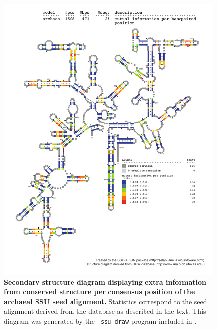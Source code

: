 \begin{figure}
\begin{center}
\includegraphics[width=5.7in]{Figures/archaea-0p1-mutinfo}
\end{center}
\caption[Secondary structure diagram displaying extra information 
  from conserved structure per consensus position of the archaeal SSU seed
  alignment]{\textbf{Secondary structure diagram displaying extra
  information from conserved structure per consensus position of the archaeal SSU seed
  alignment.} Statistics correspond to the  seed
  alignment derived from the  database \cite{CannoneGutell02}
  as described in the text. This diagram was generated by the {\tt
  ssu-draw} program included in .}
\label{fig:arcsinfo}
\end{figure}


